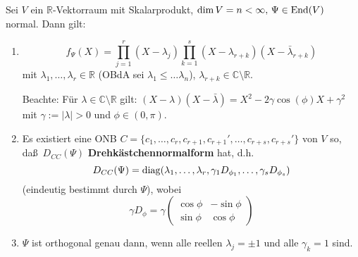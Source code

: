 \documentclass[parskip,a4paper,twoside,DIV15,BCOR12mm]{scrbook}
\begin{document}
\begin{theo}
Sei \(V\) ein \(\mathbb{R}\)-Vektorraum mit Skalarprodukt, \(\dim V=n<\infty,\,\Psi\in\operatorname{End}(V)\) normal. Dann gilt:
\begin{enumerate}
\item \[
f_{\Psi}(X)=\prod_{j=1}^{r}{(X-\lambda_{j})}\prod_{k=1}^{s}{(X-\lambda_{r+k})(X-\bar{\lambda}_{r+k})}
\]
mit \(\lambda_{1},\ldots,\lambda_{r}\in\mathbb{R}\) (OBdA sei \(\lambda_{1}\leq\ldots\lambda_{n}\)), \(\lambda_{r+k}\in\mathbb{C}\setminus\mathbb{R}\).

Beachte: Für \(\lambda\in\mathbb{C}\setminus\mathbb{R}\) gilt:
\((X-\lambda)(X-\bar{\lambda})=X^{2}-2\gamma\cos(\phi)X+\gamma^{2}\) mit 
\(\gamma:=\lvert\lambda\rvert>0\) und \(\phi\in(0,\pi)\).
\item Es existiert eine ONB \(C=\{c_{1},\ldots,c_{r},c_{r+1},c_{r+1}',\ldots,c_{r+s},c_{r+s}'\}\) 
von \(V\) so, da\ss \ \(D_{CC}(\Psi)\) \textbf{Drehkästchennormalform} hat, d.h.
\[
D_{CC}(\Psi)=\operatorname{diag}(\lambda_{1},\ldots,\lambda_{r},\gamma_{1}D_{\phi_{1}},\ldots,\gamma_{s}D_{\phi_{s}})
\]
(eindeutig bestimmt durch \(\Psi\)), wobei
\[
\gamma D_{\phi}=\gamma\begin{pmatrix}
\cos\phi&-\sin\phi\\
\sin\phi&\cos\phi
\end{pmatrix}
\]
\item \(\Psi\) ist orthogonal genau dann, wenn alle reellen \(\lambda_{j}=\pm1\)
und alle \(\gamma_{k}=1\) sind.
\end{enumerate}
\end{theo}
\end{document}
